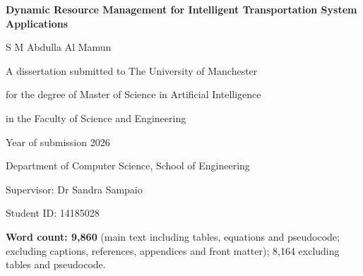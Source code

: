 \documentclass[12pt,a4paper]{article}
\begin{document}
\thispagestyle{empty}
\begin{center}
\vspace*{12mm}
\parbox{0.72\textwidth}{\centering\Large\bfseries Dynamic Resource Management for Intelligent Transportation System Applications\par}\par
\vspace{18mm}
{\large S M Abdulla Al Mamun\par}
\vspace{12mm}
A dissertation submitted to The University of Manchester\par
for the degree of Master of Science in Artificial Intelligence\par
in the Faculty of Science and Engineering\par
\vspace{8mm}
Year of submission 2026\par
\vspace{8mm}
Department of Computer Science, School of Engineering\par
\vspace{8mm}
Supervisor: Dr Sandra Sampaio\par
\end{center}
\vfill
\noindent Student ID: 14185028\par
\clearpage
\tableofcontents
\vfill\noindent\textbf{Word count: 9,860} (main text including tables, equations
and pseudocode; excluding captions, references, appendices and front matter);
8,164 excluding tables and pseudocode.\par
\clearpage
{\footnotesize\singlespacing
\listoffigures
\listoftables
}
\clearpage
\end{document}
